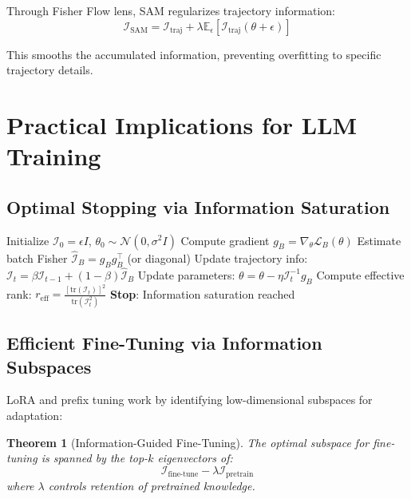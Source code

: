 \documentclass[11pt]{article}
\newtheorem{theorem}{Theorem}
\begin{document}
Through Fisher Flow lens, SAM regularizes trajectory information:
\begin{equation}
\mathcal{I}_{\text{SAM}} = \mathcal{I}_{\text{traj}} + \lambda \mathbb{E}_\epsilon[\mathcal{I}_{\text{traj}}(\theta + \epsilon)]
\end{equation}

This smooths the accumulated information, preventing overfitting to specific trajectory details.

\section{Practical Implications for LLM Training}

\subsection{Optimal Stopping via Information Saturation}

\begin{algorithm}
\caption{Information-Based Early Stopping for LLMs}
\begin{algorithmic}[1]
\State Initialize $\mathcal{I}_0 = \epsilon I$, $\theta_0 \sim \mathcal{N}(0, \sigma^2 I)$
        \State Compute gradient $g_B = \nabla_\theta \mathcal{L}_B(\theta)$
        \State Estimate batch Fisher $\hat{\mathcal{I}}_B = g_B g_B^\top$ (or diagonal)
        \State Update trajectory info: $\mathcal{I}_t = \beta \mathcal{I}_{t-1} + (1-\beta) \hat{\mathcal{I}}_B$
        \State Update parameters: $\theta = \theta - \eta \mathcal{I}_t^{-1} g_B$
    \EndFor
    \State Compute effective rank: $r_{\text{eff}} = \frac{[\text{tr}(\mathcal{I}_t)]^2}{\text{tr}(\mathcal{I}_t^2)}$
        \State \textbf{Stop}: Information saturation reached
    \EndIf
\EndFor
\end{algorithmic}
\end{algorithm}

\subsection{Efficient Fine-Tuning via Information Subspaces}

LoRA and prefix tuning work by identifying low-dimensional subspaces for adaptation:

\begin{theorem}[Information-Guided Fine-Tuning]
The optimal subspace for fine-tuning is spanned by the top-$k$ eigenvectors of:
\begin{equation}
\mathcal{I}_{\text{fine-tune}} - \lambda \mathcal{I}_{\text{pretrain}}
\end{equation}
where $\lambda$ controls retention of pretrained knowledge.
\end{theorem}
\end{document}
